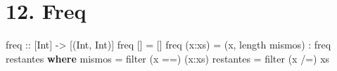 \documentclass[spanish,]{article}
\newenvironment{Shaded}{}{}
\newcommand{\DataTypeTok}[1]{\textcolor[rgb]{0.56,0.13,0.00}{#1}}
\newcommand{\FunctionTok}[1]{\textcolor[rgb]{0.02,0.16,0.49}{#1}}
\newcommand{\KeywordTok}[1]{\textcolor[rgb]{0.00,0.44,0.13}{\textbf{#1}}}
\newcommand{\NormalTok}[1]{#1}
\newcommand{\OtherTok}[1]{\textcolor[rgb]{0.00,0.44,0.13}{#1}}
\begin{document}
\hypertarget{freq}{%
\section{12. Freq}\label{freq}}

\begin{Shaded}
\begin{Highlighting}[]
\OtherTok{freq ::}\NormalTok{ [}\DataTypeTok{Int}\NormalTok{] }\OtherTok{->}\NormalTok{ [(}\DataTypeTok{Int}\NormalTok{, }\DataTypeTok{Int}\NormalTok{)]}
\NormalTok{freq    []  }\FunctionTok{=}\NormalTok{ []}
\NormalTok{freq (x}\FunctionTok{:}\NormalTok{xs) }\FunctionTok{=}\NormalTok{ (x, length mismos) }\FunctionTok{:}\NormalTok{ freq restantes}
  \KeywordTok{where}
\NormalTok{    mismos    }\FunctionTok{=}\NormalTok{ filter (x }\FunctionTok{==}\NormalTok{) (x}\FunctionTok{:}\NormalTok{xs)}
\NormalTok{    restantes }\FunctionTok{=}\NormalTok{ filter (x }\FunctionTok{/=}\NormalTok{)    xs}
\end{Highlighting}
\end{Shaded}
\end{document}
